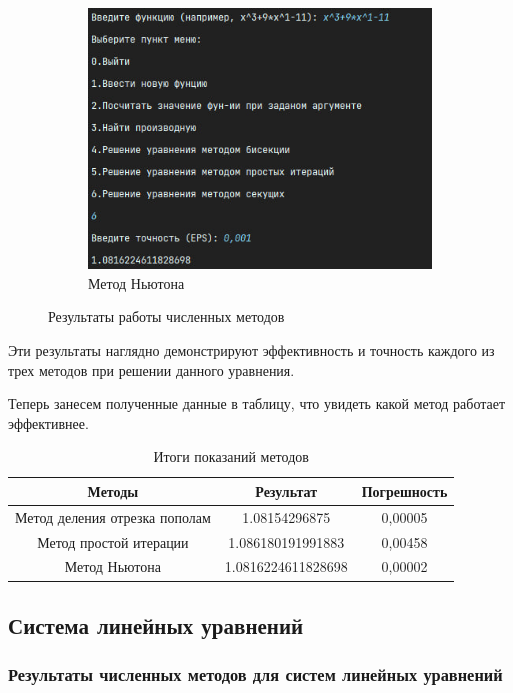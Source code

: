 \documentclass[12pt]{article}
\begin{document}
\begin{figure}[p]
  \hfill
  \begin{subfigure}[p]{0.4\textwidth}
    \centering
    \includegraphics[width=\textwidth]{newton_method.png}
    \caption{Метод Ньютона}
  \end{subfigure}
  \caption{Результаты работы численных методов}
\end{figure}

Эти результаты наглядно демонстрируют эффективность и точность каждого из трех методов при решении данного уравнения.

Теперь занесем полученные данные в таблицу, что увидеть какой метод работает эффективнее.

\begin{table}[h]
\centering
\begin{tabular}{|c|c|c|}
\hline
\textbf{Методы} & \textbf{Результат} & \textbf{Погрешность} \\
\hline
Метод деления отрезка пополам & 1.08154296875 &0,00005\\
\hline
Метод простой итерации &1.086180191991883 &0,00458 \\
\hline
Метод Ньютона &1.0816224611828698 & 0,00002 \\
\hline
\end{tabular}
\caption{Итоги показаний методов}
\end{table}

\newpage
\subsection{Система линейных уравнений}

\subsubsection{Результаты численных методов для систем линейных уравнений}
\end{document}
